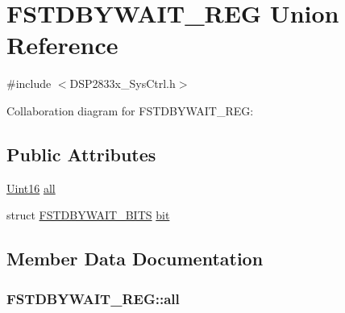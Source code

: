 \hypertarget{union_f_s_t_d_b_y_w_a_i_t___r_e_g}{}\section{F\+S\+T\+D\+B\+Y\+W\+A\+I\+T\+\_\+\+R\+E\+G Union Reference}
\label{union_f_s_t_d_b_y_w_a_i_t___r_e_g}


{\ttfamily \#include $<$D\+S\+P2833x\+\_\+\+Sys\+Ctrl.\+h$>$}



Collaboration diagram for F\+S\+T\+D\+B\+Y\+W\+A\+I\+T\+\_\+\+R\+E\+G\+:
\subsection*{Public Attributes}
\begin{DoxyCompactItemize}
\item 
\hyperlink{_d_s_p2833x___device_8h_a59a9f6be4562c327cbfb4f7e8e18f08b}{Uint16} \hyperlink{union_f_s_t_d_b_y_w_a_i_t___r_e_g_ab7dc0564d976b733ce61f4b0c1fda330}{all}
\item 
struct \hyperlink{struct_f_s_t_d_b_y_w_a_i_t___b_i_t_s}{F\+S\+T\+D\+B\+Y\+W\+A\+I\+T\+\_\+\+B\+I\+T\+S} \hyperlink{union_f_s_t_d_b_y_w_a_i_t___r_e_g_a9373cc0e11fbfed38c003b846dac753f}{bit}
\end{DoxyCompactItemize}


\subsection{Member Data Documentation}
\hypertarget{union_f_s_t_d_b_y_w_a_i_t___r_e_g_ab7dc0564d976b733ce61f4b0c1fda330}{}
\subsubsection[{all}]{ F\+S\+T\+D\+B\+Y\+W\+A\+I\+T\+\_\+\+R\+E\+G\+::all}\label{union_f_s_t_d_b_y_w_a_i_t___r_e_g_ab7dc0564d976b733ce61f4b0c1fda330}
\hypertarget{union_f_s_t_d_b_y_w_a_i_t___r_e_g_a9373cc0e11fbfed38c003b846dac753f}{}
